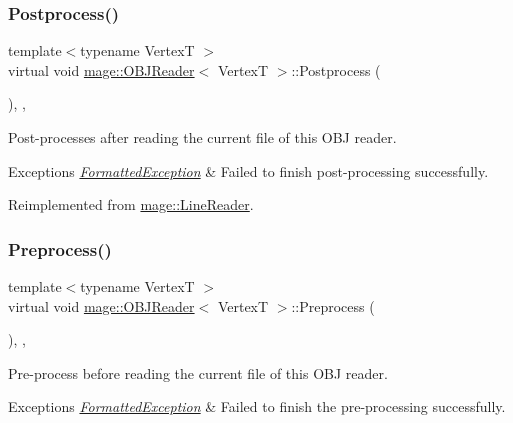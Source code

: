 \subsubsection{\texorpdfstring{Postprocess()}{Postprocess()}}
{\footnotesize\ttfamily template$<$typename VertexT $>$ \\
virtual void \hyperlink{classmage_1_1_o_b_j_reader}{mage\+::\+O\+B\+J\+Reader}$<$ VertexT $>$\+::Postprocess (\begin{DoxyParamCaption}{ }\end{DoxyParamCaption})\hspace{0.3cm}{\ttfamily [override]}, {\ttfamily [private]}, {\ttfamily [virtual]}}

Post-\/processes after reading the current file of this O\+BJ reader.


\begin{DoxyExceptions}{Exceptions}
{\em \hyperlink{structmage_1_1_formatted_exception}{Formatted\+Exception}} & Failed to finish post-\/processing successfully. \\
\hline
\end{DoxyExceptions}


Reimplemented from \hyperlink{classmage_1_1_line_reader_adfde21013140a1058d3dd567204abfb5}{mage\+::\+Line\+Reader}.

\hypertarget{classmage_1_1_o_b_j_reader_ae3a3ad3b50f1dd8dffe3109fc7dc2937}{}\label{classmage_1_1_o_b_j_reader_ae3a3ad3b50f1dd8dffe3109fc7dc2937} 
\subsubsection{\texorpdfstring{Preprocess()}{Preprocess()}}
{\footnotesize\ttfamily template$<$typename VertexT $>$ \\
virtual void \hyperlink{classmage_1_1_o_b_j_reader}{mage\+::\+O\+B\+J\+Reader}$<$ VertexT $>$\+::Preprocess (\begin{DoxyParamCaption}{ }\end{DoxyParamCaption})\hspace{0.3cm}{\ttfamily [override]}, {\ttfamily [private]}, {\ttfamily [virtual]}}

Pre-\/process before reading the current file of this O\+BJ reader.


\begin{DoxyExceptions}{Exceptions}
{\em \hyperlink{structmage_1_1_formatted_exception}{Formatted\+Exception}} & Failed to finish the pre-\/processing successfully. \\
\hline
\end{DoxyExceptions}


